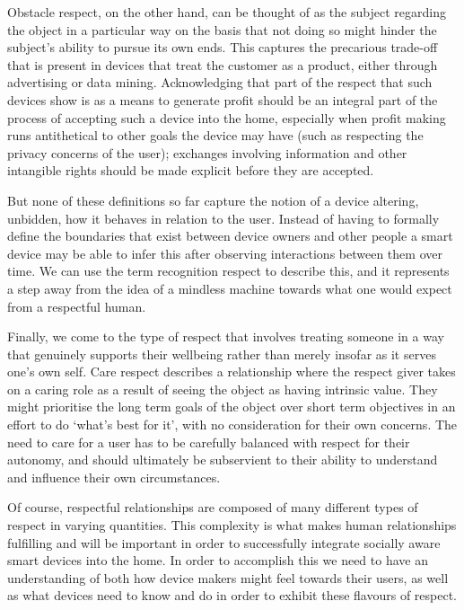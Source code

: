 \documentclass{IETpaper}
\begin{document}
Obstacle respect, on the other hand, can be thought of as the subject regarding the object in a particular way on the basis that not doing so might hinder the subject’s ability to pursue its own ends. This captures the precarious trade-off that is present in devices that treat the customer as a product, either through advertising or data mining. Acknowledging that part of the respect that such devices show is as a means to generate profit should be an integral part of the process of accepting such a device into the home, especially when profit making runs antithetical to other goals the device may have (such as respecting the privacy concerns of the user); exchanges involving information and other intangible rights should be made explicit before they are accepted.

But none of these definitions so far capture the notion of a device altering, unbidden, how it behaves in relation to the user. Instead of having to formally define the boundaries that exist between device owners and other people a smart device may be able to infer this after observing interactions between them over time. We can use the term recognition respect to describe this, and it represents a step away from the idea of a mindless machine towards what one would expect from a respectful human.

Finally, we come to the type of respect that involves treating someone in a way that genuinely supports their wellbeing rather than merely insofar as it serves one’s own self. Care respect describes a relationship where the respect giver takes on a caring role as a result of seeing the object as having intrinsic value. They might prioritise the long term goals of the object over short term objectives in an effort to do `what’s best for it’, with no consideration for their own concerns. The need to care for a user has to be carefully balanced with respect for their autonomy, and should ultimately be subservient to their ability to understand and influence their own circumstances.

Of course, respectful relationships are composed of many different types of respect in varying quantities. This complexity is what makes human relationships fulfilling and will be important in order to successfully integrate socially aware smart devices into the home. In order to accomplish this we need to have an understanding of both how device makers might feel towards their users, as well as what devices need to know and do in order to exhibit these flavours of respect.
\end{document}
